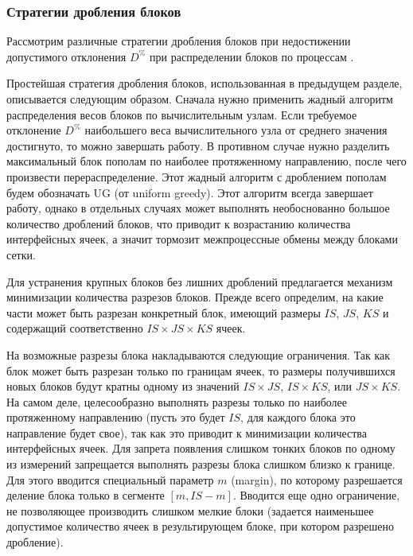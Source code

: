 \subsubsection{Стратегии дробления блоков}

Рассмотрим различные стратегии дробления блоков при недостижении допустимого отклонения $D^{\%}$ при распределении блоков по процессам \cite{Bendersky2017Eff,Bendersky2018Block}.

Простейшая стратегия дробления блоков, использованная в предыдущем разделе, описывается следующим образом.
Сначала нужно применить жадный алгоритм распределения весов блоков по вычислительным узлам.
Если требуемое отклонение $D^{\%}$ наибольшего веса вычислительного узла от среднего значения достигнуто, то можно завершать работу.
В противном случае нужно разделить максимальный блок пополам по наиболее протяженному направлению, после чего произвести перераспределение.
Этот жадный алгоритм с дроблением пополам будем обозначать UG (от uniform greedy)\label{abbr:ug}.
Этот алгоритм всегда завершает работу, однако в отдельных случаях может выполнять необоснованно большое количество дроблений блоков, что приводит к возрастанию количества интерфейсных ячеек, а значит тормозит межпроцессные обмены между блоками сетки.

Для устранения крупных блоков без лишних дроблений предлагается механизм минимизации количества разрезов блоков.
Прежде всего определим, на какие части может быть разрезан конкретный блок, имеющий размеры $IS$, $JS$, $KS$ и содержащий соответственно $IS \times JS \times KS$ ячеек.

На возможные разрезы блока накладываются следующие ограничения.
Так как блок может быть разрезан только по границам ячеек, то размеры получившихся новых блоков будут кратны одному из значений $IS \times JS$, $IS \times KS$, или $JS \times KS$.
На самом деле, целесообразно выполнять разрезы только по наиболее протяженному направлению (пусть это будет $IS$, для каждого блока это направление будет свое), так как это приводит к минимизации количества интерфейсных ячеек.
Для запрета появления слишком тонких блоков по одному из измерений запрещается выполнять разрезы блока слишком близко к границе.
Для этого вводится специальный параметр $m$ (margin), по которому разрешается деление блока только в сегменте $[m, IS - m]$.
Вводится еще одно ограничение, не позволяющее производить слишком мелкие блоки (задается наименьшее допустимое количество ячеек в результирующем блоке, при котором разрешено дробление).

